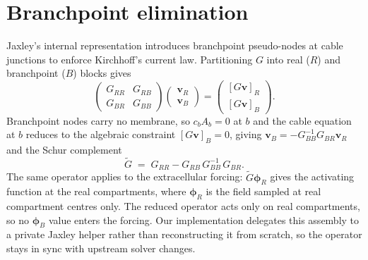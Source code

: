 
\section{Branchpoint elimination}\label{app:branchpoint-elimination}

Jaxley's internal representation introduces branchpoint pseudo-nodes
at cable junctions to enforce Kirchhoff's current law. Partitioning
$G$ into real ($R$) and branchpoint ($B$) blocks gives
\[
  \begin{pmatrix} G_{RR} & G_{RB} \\ G_{BR} & G_{BB} \end{pmatrix}
  \begin{pmatrix} \mathbf{v}_R \\ \mathbf{v}_B \end{pmatrix}
  =
  \begin{pmatrix} [G\mathbf{v}]_R \\ [G\mathbf{v}]_B \end{pmatrix}.
\]
Branchpoint nodes carry no membrane, so $c_b A_b = 0$ at $b$ and the
cable equation at $b$ reduces to the algebraic constraint
$[G\mathbf{v}]_B = 0$, giving $\mathbf{v}_B = -G_{BB}^{-1}G_{BR}\mathbf{v}_R$
and the Schur complement
\[
  \tilde{G} \;=\; G_{RR} - G_{RB}\,G_{BB}^{-1}\,G_{BR}.
\]
The same operator applies to the extracellular forcing:
$\tilde{G}\boldsymbol{\phi}_R$ gives the activating function at the
real compartments, where $\boldsymbol{\phi}_R$ is the field sampled at
real compartment centres only. The reduced operator acts only on real
compartments, so no $\boldsymbol{\phi}_B$ value enters the forcing. Our implementation delegates this assembly to a
private Jaxley helper rather than reconstructing it from scratch, so
the operator stays in sync with upstream solver changes.

